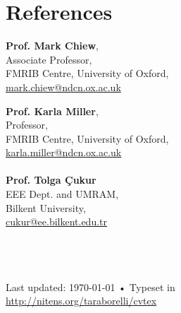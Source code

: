 \documentclass[10pt, a4paper]{article}
\begin{document}
\section*{References}
\begin{multicols}{2}

\textbf{Prof. Mark Chiew},\\
Associate Professor,\\
FMRIB Centre, University of Oxford, \\
\href{mailto:mark.chiew@ndcn.ox.ac.uk}{mark.chiew@ndcn.ox.ac.uk}

\textbf{Prof. Karla Miller},\\
Professor,\\
FMRIB Centre, University of Oxford, \\
\href{mailto:karla.miller@ndcn.ox.ac.uk}{karla.miller@ndcn.ox.ac.uk}
\\
\\
\textbf{Prof. Tolga \c{C}ukur}\\
EEE Dept. and UMRAM, \\
Bilkent University, \\
\href{mailto:cukur@ee.bilkent.edu.tr}{cukur@ee.bilkent.edu.tr}
\\
\\
\\
\\


\end{multicols}
\vfill{}

\begin{center}
{\scriptsize  Last updated: \today\- •\- 
Typeset in \href{http://nitens.org/taraborelli/cvtex}{
\LuaLaTeX}\\
\href{http://nitens.org/taraborelli/cvtex}{http://nitens.org/taraborelli/cvtex}}
\end{center}
\end{document}
